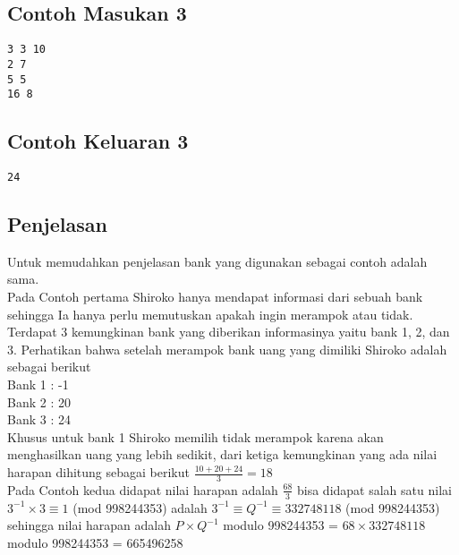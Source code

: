 \documentclass{article}
\begin{document}
\begin{multicols}{2}
\subsection*{Contoh Masukan 3}
\begin{lstlisting}
3 3 10
2 7
5 5
16 8
\end{lstlisting}
\columnbreak
\subsection*{Contoh Keluaran 3}
\begin{lstlisting}
24
\end{lstlisting}
\end{multicols}

\subsection*{Penjelasan}
Untuk memudahkan penjelasan bank yang digunakan sebagai contoh adalah sama.\\

Pada Contoh pertama Shiroko hanya mendapat informasi dari sebuah bank sehingga Ia hanya perlu memutuskan apakah ingin merampok atau tidak. Terdapat 3 kemungkinan bank yang diberikan informasinya yaitu bank 1, 2, dan 3. Perhatikan bahwa setelah merampok bank uang yang dimiliki Shiroko adalah sebagai berikut\\
Bank 1 : -1\\
Bank 2 : 20\\
Bank 3 : 24\\
Khusus untuk bank 1 Shiroko memilih tidak merampok karena akan menghasilkan uang yang lebih sedikit, dari ketiga kemungkinan yang ada nilai harapan dihitung sebagai berikut $\frac{10 + 20 + 24}{3} = 18$\\

Pada Contoh kedua didapat nilai harapan adalah $\frac{68}{3}$ bisa didapat salah satu nilai $3^{-1} \times 3 \equiv 1$ (mod 998244353) adalah $3^{-1} \equiv Q^{-1} \equiv 332748118$ (mod 998244353) sehingga nilai harapan adalah $P \times Q^{-1}$ modulo 998244353 = $68 \times 332748118$ modulo 998244353 = 665496258
\end{document}
